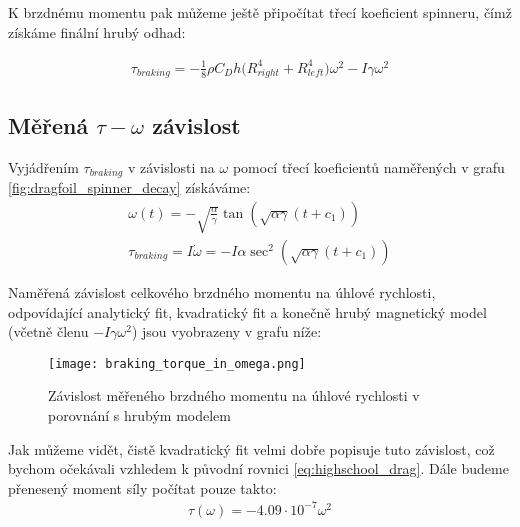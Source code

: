 K brzdnému momentu pak můžeme ještě připočítat třecí koeficient spinneru, čímž získáme finální hrubý odhad:

\begin{equation}
    \label{eq:braking_torque_w_spinner_drag}
    \begin{gathered}
        \tau_{braking} = -\frac{1}{8} \rho C_D h \big( R_{right}^4 + R_{left}^4 \big) \omega^2 -I\gamma\omega^2
    \end{gathered}
\end{equation}

\clearpage

\subsection{Měřená $\tau-\omega$ závislost}

Vyjádřením $\tau_{braking}$ v závislosti na $\omega$ pomocí třecí koeficientů naměřených v grafu \ref{fig:dragfoil_spinner_decay} získáváme:
\begin{equation}
    \label{eq:braking_torque_from_coefs}
    \begin{gathered}
        \omega(t) = - \sqrt{\frac{\alpha}{\gamma}} \tan{(\sqrt{\alpha\gamma}(t+c_1))} \\
        \tau_{braking} = I\dot{\omega} = -I\alpha \sec^2(\sqrt{\alpha \gamma} (t + c_1))
    \end{gathered}
\end{equation}

Naměřená závislost celkového brzdného momentu na úhlové rychlosti, odpovídající analytický fit, kvadratický fit a konečně hrubý magnetický model (včetně členu $-I\gamma\omega^2$) jsou vyobrazeny v grafu níže:

\begin{figure}[H]
    \texttt{[image: braking\_torque\_in\_omega.png]}
    \centering
    \caption[Závislost brzdného momentu na úhlové rychlosti]{Závislost měřeného brzdného momentu na úhlové rychlosti v porovnání s hrubým modelem}
    \label{fig:braking_torque_in_omega}
\end{figure}

Jak můžeme vidět, čistě kvadratický fit velmi dobře popisuje tuto závislost, což bychom očekávali vzhledem k původní rovnici \ref{eq:highschool_drag}. Dále budeme přenesený moment síly počítat pouze takto: 
\begin{equation}
    \label{eq:torque_transf_final}
    \begin{gathered}
        \tau(\omega) = -4.09\cdot10^{-7}\omega^2
    \end{gathered}
\end{equation}

